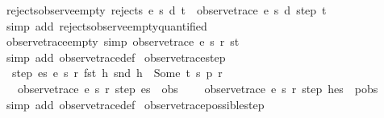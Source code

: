 \begin{isabellebody}
%
\endisatagproof
{\isafoldproof}%
%
\isadelimproof
\isanewline
%
\endisadelimproof
\isanewline
{}\isamarkupfalse%
\ rejects{\isacharunderscore}observe{\isacharunderscore}empty{\isacharcolon}\ {\isachardoublequoteopen}rejects\ e\ s\ d\ t\ {\isasymLongrightarrow}\ observe{\isacharunderscore}trace\ e\ s\ d\ step\ t\ {\isacharequal}\ {\isacharbrackleft}{\isacharbrackright}{\isachardoublequoteclose}\isanewline
%
\isadelimproof
\ \ %
\endisadelimproof
%
\isatagproof
{}\isamarkupfalse%
\ {\isacharparenleft}simp\ add{\isacharcolon}\ rejects{\isacharunderscore}observe{\isacharunderscore}empty{\isacharunderscore}quantified{\isacharparenright}%
\endisatagproof
{\isafoldproof}%
%
\isadelimproof
\isanewline
%
\endisadelimproof
\isanewline
{}\isamarkupfalse%
\ observe{\isacharunderscore}trace{\isacharunderscore}empty\ {\isacharbrackleft}simp{\isacharbrackright}{\isacharcolon}\ {\isachardoublequoteopen}observe{\isacharunderscore}trace\ e\ s\ r\ st\ {\isacharbrackleft}{\isacharbrackright}\ {\isacharequal}\ {\isacharbrackleft}{\isacharbrackright}{\isachardoublequoteclose}\isanewline
%
\isadelimproof
\ \ %
\endisadelimproof
%
\isatagproof
{}\isamarkupfalse%
\ {\isacharparenleft}simp\ add{\isacharcolon}\ observe{\isacharunderscore}trace{\isacharunderscore}def{\isacharparenright}%
\endisatagproof
{\isafoldproof}%
%
\isadelimproof
\isanewline
%
\endisadelimproof
\isanewline
{}\isamarkupfalse%
\ observe{\isacharunderscore}trace{\isacharunderscore}step{\isacharcolon}\ \isanewline
\ \ {\isachardoublequoteopen}step\ es\ e\ s\ r\ {\isacharparenleft}fst\ h{\isacharparenright}\ {\isacharparenleft}snd\ h{\isacharparenright}\ {\isacharequal}\ Some\ {\isacharparenleft}t{\isacharcomma}\ s{\isacharprime}{\isacharcomma}\ p{\isacharcomma}\ r{\isacharprime}{\isacharparenright}\ {\isasymLongrightarrow}\isanewline
\ \ \ observe{\isacharunderscore}trace\ e\ s{\isacharprime}\ r{\isacharprime}\ step\ es\ {\isacharequal}\ obs\ {\isasymLongrightarrow}\isanewline
\ \ \ observe{\isacharunderscore}trace\ e\ s\ r\ step\ {\isacharparenleft}h{\isacharhash}es{\isacharparenright}\ {\isacharequal}\ p{\isacharhash}obs{\isachardoublequoteclose}\isanewline
%
\isadelimproof
\ \ %
\endisadelimproof
%
\isatagproof
{}\isamarkupfalse%
\ {\isacharparenleft}simp\ add{\isacharcolon}\ observe{\isacharunderscore}trace{\isacharunderscore}def{\isacharparenright}%
\endisatagproof
{\isafoldproof}%
%
\isadelimproof
\isanewline
%
\endisadelimproof
\isanewline
{}\isamarkupfalse%
\ observe{\isacharunderscore}trace{\isacharunderscore}possible{\isacharunderscore}step{\isacharcolon}\isanewline

\end{isabellebody}
